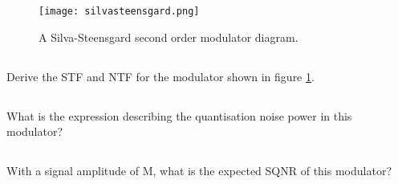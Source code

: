 \section{}

\begin{figure}
    \begin{center}
    \texttt{[image: silvasteensgard.png]}
    \caption{A Silva-Steensgard second order modulator diagram.}
    \label{fig:silva}
    \end{center}
\end{figure}
    \subsection{}
    Derive the STF and NTF for the modulator shown in figure \ref{fig:silva}.



    \subsection{}
    What is the expression describing the quantisation noise power in this modulator?


    \subsection{}
    With a signal amplitude of M, what is the expected SQNR of this modulator?

